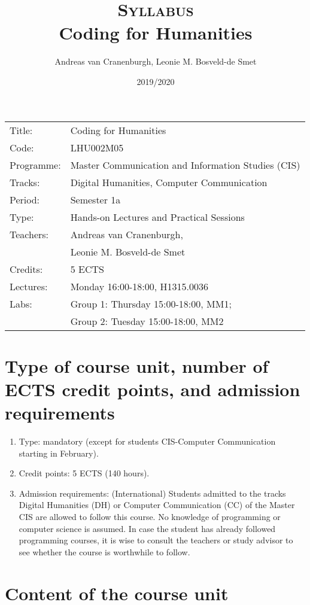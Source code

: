\documentclass[a4paper,12pt]{article}
\title{\textsc{Syllabus}\\Coding for Humanities}
\author{Andreas van Cranenburgh, Leonie M. Bosveld-de Smet}
\date{2019/2020}
\begin{document}
\maketitle
\thispagestyle{empty}
\pagestyle{empty}


\begin{tabular}{l p{} }
	Title:      & Coding for Humanities \\
	Code:       & LHU002M05 \\
	Programme:  & Master Communication and Information Studies (CIS) \\
	Tracks:     & Digital Humanities, Computer Communication \\
	Period:     & Semester 1a \\
	Type:       & Hands-on Lectures and Practical Sessions \\
	Teachers:   & Andreas van Cranenburgh, \\
				& Leonie M. Bosveld-de Smet \\
	Credits:    & 5 ECTS \\
	Lectures:	& Monday 16:00-18:00, H1315.0036 \\
	Labs:		& Group 1: Thursday 15:00-18:00, MM1; \\
				& Group 2: Tuesday 15:00-18:00, MM2 \\
\end{tabular}



\section{Type of course unit, number of ECTS credit points,
		and admission requirements}
\begin{enumerate}[label={(\alph*)}]
	\item Type: mandatory (except for students CIS-Computer Communication
		starting in February).
	\item Credit points: 5 ECTS (140 hours).
	\item Admission requirements: (International) Students admitted to the
		tracks Digital Humanities (DH) or Computer Communication (CC) of the
		Master CIS are allowed to follow this course. No knowledge of
		programming or computer science is assumed. In case the student has
		already followed programming courses, it is wise to consult the
		teachers or study advisor to see whether the course is worthwhile to
		follow.
\end{enumerate}

\section{Content of the course unit}
\end{document}
